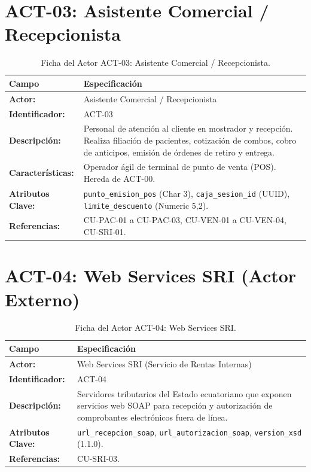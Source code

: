 \documentclass[12pt,a4paper]{report}
\begin{document}
\section{ACT-03: Asistente Comercial / Recepcionista}
\begin{table}[H]
\centering
\small
\begin{tabularx}{\textwidth}{|L{3.5cm}|X|}
\hline
{}\color{white}\textbf{Campo} & \color{white}\textbf{Especificación} \\
\hline
\textbf{Actor:} & Asistente Comercial / Recepcionista \\
\hline
\textbf{Identificador:} & ACT-03 \\
\hline
\textbf{Descripción:} & Personal de atención al cliente en mostrador y recepción. Realiza filiación de pacientes, cotización de combos, cobro de anticipos, emisión de órdenes de retiro y entrega. \\
\hline
\textbf{Características:} & Operador ágil de terminal de punto de venta (POS). Hereda de ACT-00. \\
\hline
\textbf{Atributos Clave:} & \texttt{punto\_emision\_pos} (Char 3), \texttt{caja\_sesion\_id} (UUID), \texttt{limite\_descuento} (Numeric 5,2). \\
\hline
\textbf{Referencias:} & CU-PAC-01 a CU-PAC-03, CU-VEN-01 a CU-VEN-04, CU-SRI-01. \\
\hline
\end{tabularx}
\caption{Ficha del Actor ACT-03: Asistente Comercial / Recepcionista.}
\end{table}

\section{ACT-04: Web Services SRI (Actor Externo)}
\begin{table}[H]
\centering
\small
\begin{tabularx}{\textwidth}{|L{3.5cm}|X|}
\hline
{}\color{white}\textbf{Campo} & \color{white}\textbf{Especificación} \\
\hline
\textbf{Actor:} & Web Services SRI (Servicio de Rentas Internas) \\
\hline
\textbf{Identificador:} & ACT-04 \\
\hline
\textbf{Descripción:} & Servidores tributarios del Estado ecuatoriano que exponen servicios web SOAP para recepción y autorización de comprobantes electrónicos fuera de línea. \\
\hline
\textbf{Atributos Clave:} & \texttt{url\_recepcion\_soap}, \texttt{url\_autorizacion\_soap}, \texttt{version\_xsd} (1.1.0). \\
\hline
\textbf{Referencias:} & CU-SRI-03. \\
\hline
\end{tabularx}
\caption{Ficha del Actor ACT-04: Web Services SRI.}
\end{table}
\end{document}
